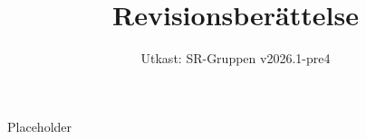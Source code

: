 \documentclass[a4paper]{dtek}
\title{Revisionsberättelse}
\date{Utkast: SR-Gruppen v2026.1-pre4}
\begin{document}
Placeholder
\end{document}
